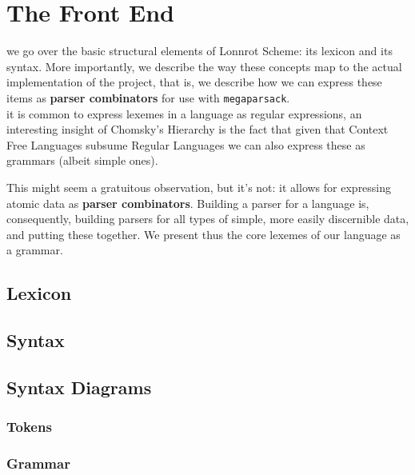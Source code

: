 \chapter{The Front End}\label{ch:one}


 we go over the basic structural elements of Lonnrot Scheme: its lexicon and its syntax. More
importantly, we describe the way these concepts map to the actual implementation of the project, that is,
we describe how we can express these items as \textbf{parser combinators} for use with \texttt{megaparsack}.\\

 it is common to express lexemes in a language as regular expressions, an interesting insight
of Chomsky's Hierarchy is the fact that given that Context Free Languages subsume Regular Languages we
can also express these as grammars (albeit simple ones).

This might seem a gratuitous observation, but it's not: it allows for expressing atomic data as
\textbf{parser combinators}. Building a parser for a language is, consequently, building parsers for all types
of simple, more easily discernible data, and putting these together. We present thus the core lexemes
of our language as a grammar.\clearpage


\section{Lexicon}\label{sec:ch1_lex}

\clearpage

\section{Syntax}\label{sec:ch1_syn}

\clearpage

\section{Syntax Diagrams}\label{sec:ch1_SD}
\subsection{Tokens}


\subsection{Grammar}

